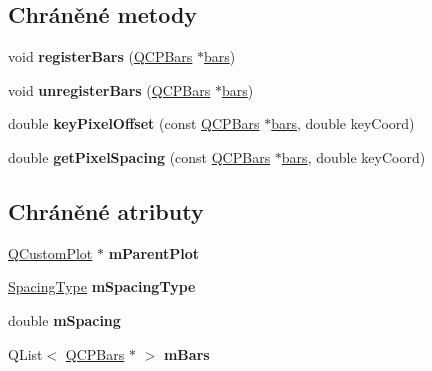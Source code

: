 \subsection*{Chráněné metody}
\begin{DoxyCompactItemize}
\item 
\hypertarget{classQCPBarsGroup_a7b00514f19ad58d0bb3fd5246a67fae2}{}void {\bfseries register\+Bars} (\hyperlink{classQCPBars}{Q\+C\+P\+Bars} $\ast$\hyperlink{classQCPBarsGroup_a7c72ed1f8cd962c93b8c42ab96cd91ec}{bars})\label{classQCPBarsGroup_a7b00514f19ad58d0bb3fd5246a67fae2}

\item 
\hypertarget{classQCPBarsGroup_ac7073cdd7b1a40c6cb4b5f908145f8c4}{}void {\bfseries unregister\+Bars} (\hyperlink{classQCPBars}{Q\+C\+P\+Bars} $\ast$\hyperlink{classQCPBarsGroup_a7c72ed1f8cd962c93b8c42ab96cd91ec}{bars})\label{classQCPBarsGroup_ac7073cdd7b1a40c6cb4b5f908145f8c4}

\item 
\hypertarget{classQCPBarsGroup_a8e2ca6002e7bab49670144d048a2bcc9}{}double {\bfseries key\+Pixel\+Offset} (const \hyperlink{classQCPBars}{Q\+C\+P\+Bars} $\ast$\hyperlink{classQCPBarsGroup_a7c72ed1f8cd962c93b8c42ab96cd91ec}{bars}, double key\+Coord)\label{classQCPBarsGroup_a8e2ca6002e7bab49670144d048a2bcc9}

\item 
\hypertarget{classQCPBarsGroup_a0beccd41bc3841a4c5b284823bc7d2de}{}double {\bfseries get\+Pixel\+Spacing} (const \hyperlink{classQCPBars}{Q\+C\+P\+Bars} $\ast$\hyperlink{classQCPBarsGroup_a7c72ed1f8cd962c93b8c42ab96cd91ec}{bars}, double key\+Coord)\label{classQCPBarsGroup_a0beccd41bc3841a4c5b284823bc7d2de}

\end{DoxyCompactItemize}
\subsection*{Chráněné atributy}
\begin{DoxyCompactItemize}
\item 
\hypertarget{classQCPBarsGroup_a973d408cfbf88db95115aec71877f9e7}{}\hyperlink{classQCustomPlot}{Q\+Custom\+Plot} $\ast$ {\bfseries m\+Parent\+Plot}\label{classQCPBarsGroup_a973d408cfbf88db95115aec71877f9e7}

\item 
\hypertarget{classQCPBarsGroup_a6794ee1a9c81864d627bff6a4b2d64ec}{}\hyperlink{classQCPBarsGroup_a4c0521120a97e60bbca37677a37075b6}{Spacing\+Type} {\bfseries m\+Spacing\+Type}\label{classQCPBarsGroup_a6794ee1a9c81864d627bff6a4b2d64ec}

\item 
\hypertarget{classQCPBarsGroup_a56471d7f548ca6141b7a5bf9629f7ece}{}double {\bfseries m\+Spacing}\label{classQCPBarsGroup_a56471d7f548ca6141b7a5bf9629f7ece}

\item 
\hypertarget{classQCPBarsGroup_affdb1e9233c277ff5a4c0a1121cf1fc0}{}Q\+List$<$ \hyperlink{classQCPBars}{Q\+C\+P\+Bars} $\ast$ $>$ {\bfseries m\+Bars}\label{classQCPBarsGroup_affdb1e9233c277ff5a4c0a1121cf1fc0}

\end{DoxyCompactItemize}
